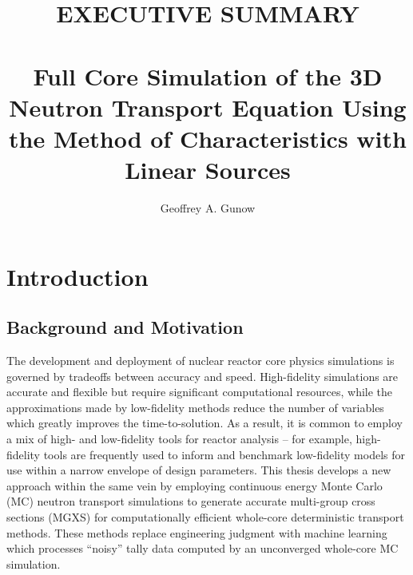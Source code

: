 \documentclass[12pt,twoside]{mitthesis-exec}
\begin{document}



\title{EXECUTIVE SUMMARY \\~\\ Full Core Simulation of the 3D Neutron Transport Equation Using the Method of Characteristics with Linear Sources}

\author{Geoffrey A. Gunow}








\singlespacing 

\section*{Introduction}

\subsection*{Background and Motivation}

The development and deployment of nuclear reactor core physics simulations is governed by tradeoffs between accuracy and speed. High-fidelity simulations are accurate and flexible but require significant computational resources, while the approximations made by low-fidelity methods reduce the number of variables which greatly improves the time-to-solution. As a result, it is common to employ a mix of high- and low-fidelity tools for reactor analysis -- for example, high-fidelity tools are frequently used to inform and benchmark low-fidelity models for use within a narrow envelope of design parameters. This thesis develops a new approach within the same vein by employing continuous energy Monte Carlo (MC) neutron transport simulations to generate accurate multi-group cross sections (MGXS) for computationally efficient whole-core deterministic transport methods. These methods replace engineering judgment with machine learning which processes ``noisy'' tally data computed by an unconverged whole-core MC simulation.
\end{document}

